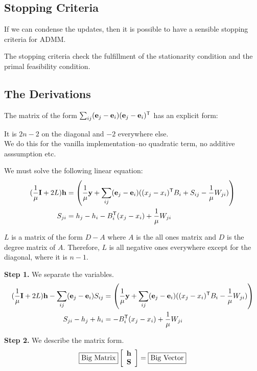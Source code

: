 \documentclass{article}
\begin{document}
\subsection{Stopping Criteria}

If we can condense the updates, then it is possible to have a sensible stopping criteria for ADMM.

The stopping criteria check the fulfillment of the stationarity condition and the primal feasibility condition.



\subsection{The Derivations}

The matrix of the form $\sum_{ij} (\mathbf{e}_j - \mathbf{e}_i) (\mathbf{e}_j - \mathbf{e}_i)^{\mathsf{T}}$ has an explicit form:

It is $2n -2$ on the diagonal and $-2$ everywhere else.\\

We do this for the vanilla implementation--no quadratic term, no additive asssumption etc.

We must solve the following linear equation:
\begin{align*}
( \frac{1}{\mu} \mathbf{I} + 2L ) \mathbf{h} &= \left( \frac{1}{\mu} \mathbf{y} + \sum_{ij} (\mathbf{e}_j - \mathbf{e}_i) ((x_j - x_i)^{\mathsf{T}} B_i + S_{ij} - \frac{1}{\mu} W_{ji}) \right) \\
S_{ji} &= h_j - h_i - B_i^{\mathsf{T}} (x_j - x_i) + \frac{1}{\mu} W_{ji}
\end{align*}

$L$ is a matrix of the form $D - A$ where $A$ is the all ones matrix and $D$ is the degree matrix of $A$. Therefore, $L$ is all negative ones everywhere except for the diagonal, where it is $n-1$.

\textbf{Step 1.} We separate the variables.
\begin{align*}
( \frac{1}{\mu} \mathbf{I} + 2L ) \mathbf{h} - \sum_{ij} (\mathbf{e}_j - \mathbf{e}_i) S_{ij} &= \left( \frac{1}{\mu} \mathbf{y} + \sum_{ij} (\mathbf{e}_j - \mathbf{e}_i) ((x_j - x_i)^{\mathsf{T}} B_i - \frac{1}{\mu} W_{ji}) \right) \\
S_{ji} - h_j + h_i &= - B_i^{\mathsf{T}} (x_j - x_i) + \frac{1}{\mu} W_{ji}
\end{align*}

\textbf{Step 2.} We describe the matrix form.
\[
\boxed{\textrm{Big Matrix}} \left[\begin{array}{c} \mathbf{h} \\ \mathbf{S} \end{array}\right] = \boxed{\textrm{Big Vector}}
\]
\end{document}
